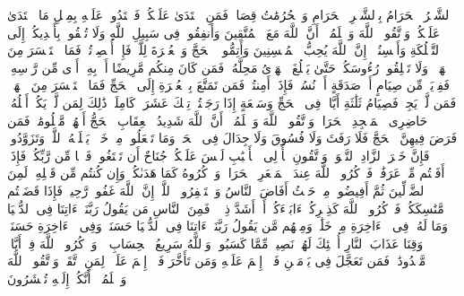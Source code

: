 \startbuffer[\q:2:194]
ٱلشَّهۡرُ ٱلۡحَرَامُ بِٱلشَّهۡرِ ٱلۡحَرَامِ وَٱلۡحُرُمَٰتُ قِصَاصࣱۚ فَمَنِ ٱعۡتَدَىٰ عَلَیۡكُمۡ فَٱعۡتَدُوا۟ عَلَیۡهِ بِمِثۡلِ مَا ٱعۡتَدَىٰ عَلَیۡكُمۡۚ وَٱتَّقُوا۟ ٱللَّهَ وَٱعۡلَمُوۤا۟ أَنَّ ٱللَّهَ مَعَ ٱلۡمُتَّقِینَ%
\stopbuffer%
\startbuffer[\q:2:195]
وَأَنفِقُوا۟ فِی سَبِیلِ ٱللَّهِ وَلَا تُلۡقُوا۟ بِأَیۡدِیكُمۡ إِلَى ٱلتَّهۡلُكَةِ وَأَحۡسِنُوۤا۟ۚ إِنَّ ٱللَّهَ یُحِبُّ ٱلۡمُحۡسِنِینَ%
\stopbuffer%
\startbuffer[\q:2:196]
وَأَتِمُّوا۟ ٱلۡحَجَّ وَٱلۡعُمۡرَةَ لِلَّهِۚ فَإِنۡ أُحۡصِرۡتُمۡ فَمَا ٱسۡتَیۡسَرَ مِنَ ٱلۡهَدۡیِۖ وَلَا تَحۡلِقُوا۟ رُءُوسَكُمۡ حَتَّىٰ یَبۡلُغَ ٱلۡهَدۡیُ مَحِلَّهُۥۚ فَمَن كَانَ مِنكُم مَّرِیضًا أَوۡ بِهِۦۤ أَذࣰى مِّن رَّأۡسِهِۦ فَفِدۡیَةࣱ مِّن صِیَامٍ أَوۡ صَدَقَةٍ أَوۡ نُسُكࣲۚ فَإِذَاۤ أَمِنتُمۡ فَمَن تَمَتَّعَ بِٱلۡعُمۡرَةِ إِلَى ٱلۡحَجِّ فَمَا ٱسۡتَیۡسَرَ مِنَ ٱلۡهَدۡیِۚ فَمَن لَّمۡ یَجِدۡ فَصِیَامُ ثَلَٰثَةِ أَیَّامࣲ فِی ٱلۡحَجِّ وَسَبۡعَةٍ إِذَا رَجَعۡتُمۡۗ تِلۡكَ عَشَرَةࣱ كَامِلَةࣱۗ ذَٰلِكَ لِمَن لَّمۡ یَكُنۡ أَهۡلُهُۥ حَاضِرِی ٱلۡمَسۡجِدِ ٱلۡحَرَامِۚ وَٱتَّقُوا۟ ٱللَّهَ وَٱعۡلَمُوۤا۟ أَنَّ ٱللَّهَ شَدِیدُ ٱلۡعِقَابِ%
\stopbuffer%
\startbuffer[\q:2:197]
ٱلۡحَجُّ أَشۡهُرࣱ مَّعۡلُومَٰتࣱۚ فَمَن فَرَضَ فِیهِنَّ ٱلۡحَجَّ فَلَا رَفَثَ وَلَا فُسُوقَ وَلَا جِدَالَ فِی ٱلۡحَجِّۗ وَمَا تَفۡعَلُوا۟ مِنۡ خَیۡرࣲ یَعۡلَمۡهُ ٱللَّهُۗ وَتَزَوَّدُوا۟ فَإِنَّ خَیۡرَ ٱلزَّادِ ٱلتَّقۡوَىٰۖ وَٱتَّقُونِ یَٰۤأُو۟لِی ٱلۡأَلۡبَٰبِ%
\stopbuffer%
\startbuffer[\q:2:198]
لَیۡسَ عَلَیۡكُمۡ جُنَاحٌ أَن تَبۡتَغُوا۟ فَضۡلࣰا مِّن رَّبِّكُمۡۚ فَإِذَاۤ أَفَضۡتُم مِّنۡ عَرَفَٰتࣲ فَٱذۡكُرُوا۟ ٱللَّهَ عِندَ ٱلۡمَشۡعَرِ ٱلۡحَرَامِۖ وَٱذۡكُرُوهُ كَمَا هَدَىٰكُمۡ وَإِن كُنتُم مِّن قَبۡلِهِۦ لَمِنَ ٱلضَّاۤلِّینَ%
\stopbuffer%
\startbuffer[\q:2:199]
ثُمَّ أَفِیضُوا۟ مِنۡ حَیۡثُ أَفَاضَ ٱلنَّاسُ وَٱسۡتَغۡفِرُوا۟ ٱللَّهَۚ إِنَّ ٱللَّهَ غَفُورࣱ رَّحِیمࣱ%
\stopbuffer%
\startbuffer[\q:2:200]
فَإِذَا قَضَیۡتُم مَّنَٰسِكَكُمۡ فَٱذۡكُرُوا۟ ٱللَّهَ كَذِكۡرِكُمۡ ءَابَاۤءَكُمۡ أَوۡ أَشَدَّ ذِكۡرࣰاۗ فَمِنَ ٱلنَّاسِ مَن یَقُولُ رَبَّنَاۤ ءَاتِنَا فِی ٱلدُّنۡیَا وَمَا لَهُۥ فِی ٱلۡءَاخِرَةِ مِنۡ خَلَٰقࣲ%
\stopbuffer%
\startbuffer[\q:2:201]
وَمِنۡهُم مَّن یَقُولُ رَبَّنَاۤ ءَاتِنَا فِی ٱلدُّنۡیَا حَسَنَةࣰ وَفِی ٱلۡءَاخِرَةِ حَسَنَةࣰ وَقِنَا عَذَابَ ٱلنَّارِ%
\stopbuffer%
\startbuffer[\q:2:202]
أُو۟لَٰۤئِكَ لَهُمۡ نَصِیبࣱ مِّمَّا كَسَبُوا۟ۚ وَٱللَّهُ سَرِیعُ ٱلۡحِسَابِ%
\stopbuffer%
\startbuffer[\q:2:203]
۞ وَٱذۡكُرُوا۟ ٱللَّهَ فِیۤ أَیَّامࣲ مَّعۡدُودَٰتࣲۚ فَمَن تَعَجَّلَ فِی یَوۡمَیۡنِ فَلَاۤ إِثۡمَ عَلَیۡهِ وَمَن تَأَخَّرَ فَلَاۤ إِثۡمَ عَلَیۡهِۖ لِمَنِ ٱتَّقَىٰۗ وَٱتَّقُوا۟ ٱللَّهَ وَٱعۡلَمُوۤا۟ أَنَّكُمۡ إِلَیۡهِ تُحۡشَرُونَ%
\stopbuffer%
\startbuffer[\q:2:204]
